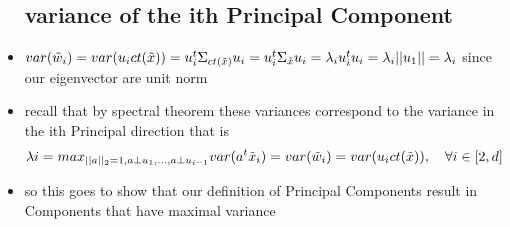 \documentclass{article}
\begin{document}
\begin{itemize}
\subsection*{variance of the ith Principal Component}
\item $var(\Tilde{w}_{i})=var(u_ict(\Tilde{x}))=u_i^{t}\Sigma_{ct(\Tilde{x})}u_i=u_i^{t}\Sigma_{\Tilde{x}}u_i=\lambda_i u_i^{t}u_i=\lambda_{i}||u_1||=\lambda_i$ since our eigenvector are unit norm 
\item recall that by spectral theorem these variances correspond to the variance in the ith Principal direction that is $$\lambda{i}=max_{||a||_2=1, a\perp u_1,\dots, a\perp u_{i-1}}var(a^t\Tilde{x}_{i})=var(\Tilde{w}_i)=var(u_ict(\Tilde{x})), \quad \forall i \in [2,d]$$
\item so this goes to show that our definition of Principal Components result in Components that have maximal variance

\end{itemize}
\end{document}
